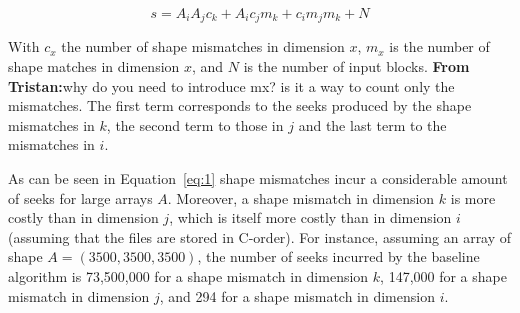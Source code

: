 \documentclass[sigconf, nonacm]{acmart}
\newcommand{\tristan}[1]{\color{orange}\textbf{From Tristan:}#1\color{black}}
\begin{document}
\begin{equation} \label{eq:1}
s = A_i A_j c_k + A_i c_j m_k + c_i m_j m_k + N
\end{equation}

With $c_x$ the number of shape mismatches in dimension $x$, $m_x$ is the
number of shape matches in dimension $x$, and $N$ is the number of input blocks. \tristan{why do you need to introduce mx? is it a way to count only the mismatches}.
 The first term corresponds to the seeks produced
by the shape mismatches in $k$, the second term to those in $j$ and the last
term to the mismatches in $i$.

As can be seen in Equation~\ref{eq:1} shape mismatches incur a considerable
 amount of seeks for large arrays $A$. Moreover, a shape mismatch in
 dimension $k$  is more costly than in  dimension $j$, which is itself more
 costly than in dimension $i$ (assuming that the files are stored in
 C-order). For instance, assuming an array of shape $A=(3500, 3500, 3500)$,
 the number of seeks incurred by the baseline algorithm is 73,500,000 for a shape mismatch in dimension $k$, 
 147,000 for a shape mismatch in dimension $j$, and 294 for a shape mismatch in dimension $i$.



\end{document}
